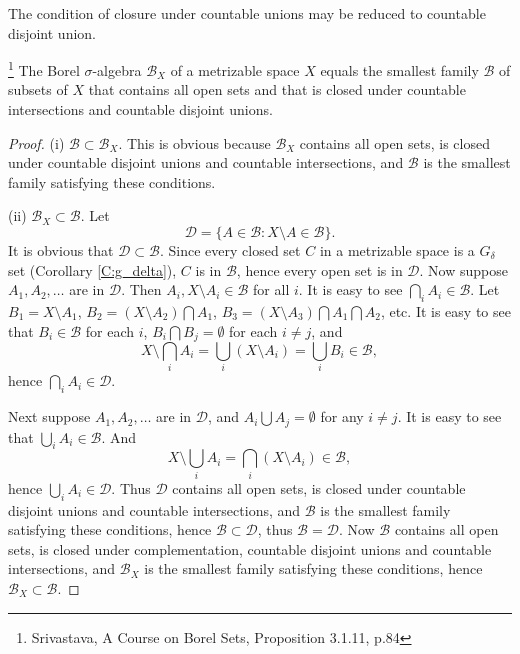The condition of closure under countable unions may be reduced to countable
disjoint union.
\begin{proposition} \label{P:borel_gen3}
\footnote{Srivastava, A Course on Borel Sets, Proposition 3.1.11, p.84}
The Borel $\sigma$-algebra $\mathcal{B}_X$ of a metrizable space $X$ equals the
smallest family $\mathcal{B}$ of subsets of $X$ that contains all open sets and
that is closed under countable intersections and countable disjoint unions.
\end{proposition}
\begin{proof}
(i) $\mathcal{B}\subset\mathcal{B}_X$. This is obvious because 
$\mathcal{B}_X$ contains all open sets, is closed under countable disjoint unions and 
countable intersections, and $\mathcal{B}$ is the smallest family satisfying 
these conditions.

(ii) $\mathcal{B}_X\subset\mathcal{B}$. Let
\[
	\mathcal{D} = \{ A\in\mathcal{B}: X\setminus A\in\mathcal{B} \}.
\]
It is obvious that $\mathcal{D}\subset\mathcal{B}$.
Since every closed set $C$ in a metrizable space is a $G_{\delta}$ set (Corollary 
\ref{C:g_delta}), $C$ is in $\mathcal{B}$, hence every open set is in
$\mathcal{D}$. Now suppose $A_1,A_2,\dots$ are in $\mathcal{D}$. Then
$A_i,X\setminus A_i\in\mathcal{B}$ for all $i$. It is easy to see
$\bigcap_i A_i\in\mathcal{B}$. Let $B_1=X\setminus A_1$, 
$B_2=(X\setminus A_2)\bigcap A_1$, 
$B_3=(X\setminus A_3)\bigcap A_1 \bigcap A_2$, etc. It is easy to see that 
$B_i\in\mathcal{B}$ for each $i$, $B_i\bigcap B_j=\emptyset$ for each $i\ne j$,
and
\[
	X\setminus\bigcap_i A_i = \bigcup_i (X\setminus A_i)
	  = \bigcup_i B_i \in \mathcal{B},
\]
hence $\bigcap_i A_i\in\mathcal{D}$.

Next suppose $A_1,A_2,\dots$ are in $\mathcal{D}$, and 
$A_i\bigcup A_j=\emptyset$ for any $i\ne j$. It is easy to see that 
$\bigcup_i A_i\in\mathcal{B}$. And
\[
	X\setminus\bigcup_i A_i = \bigcap_i (X\setminus A_i) \in \mathcal{B},
\]
hence $\bigcup_i A_i\in\mathcal{D}$.
Thus $\mathcal{D}$ contains all open sets, is closed under countable disjoint unions and 
countable intersections, and $\mathcal{B}$ is the smallest family satisfying 
these conditions, hence $\mathcal{B}\subset\mathcal{D}$, thus 
$\mathcal{B}=\mathcal{D}$.
Now $\mathcal{B}$ contains all open sets, is closed under complementation,
countable disjoint unions and countable intersections, and $\mathcal{B}_X$ is the smallest 
family satisfying these conditions, hence $\mathcal{B}_X\subset\mathcal{B}$.
\end{proof}

